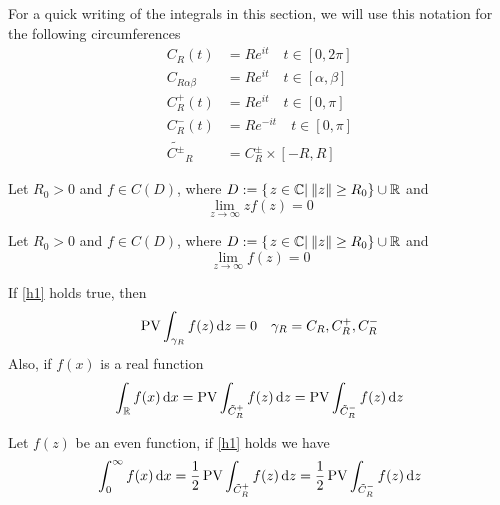 \documentclass[../complete.tex]{subfiles}
\begin{document}
\begin{ntn}
	For a quick writing of the integrals in this section, we will use this notation for the following circumferences
	\begin{equation*}
		\begin{aligned}
			C_R(t)&=Re^{it}\quad t\in[0,2\pi]\\
			C_{R\alpha\beta}&=Re^{it}\quad t\in[\alpha,\beta]\\
			C_R^+(t)&=Re^{it}\quad t\in[0,\pi]\\
			C_R^-(t)&=Re^{-it}\quad t\in[0,\pi]\\
			\tilde{C^{\pm}}_R&=C_R^{\pm}\times[-R,R]
		\end{aligned}
	\end{equation*}
\end{ntn}
\begin{hyp}
	Let $R_0>0$ and $f\in C(D)$, where $D:=\left\{ \left.z\in\mathbb{C}\right|_{}\norm{z}\ge R_0 \right\}\cup\mathbb{R}$ and
	\begin{equation*}
		\lim_{z\to\infty}zf(z)=0
	\end{equation*}
	\label{h1}
\end{hyp}
\begin{hyp}
	Let $R_0>0$ and $f\in C(D)$, where $D:=\left\{ \left.z\in\mathbb{C}\right|_{}\norm{z}\ge R_0 \right\}\cup\mathbb{R}$ and
	\begin{equation*}
		\lim_{z\to\infty}f(z)=0
	\end{equation*}
	\label{h2}
\end{hyp}
\begin{thm}
	If \eqref{h1} holds true, then
	\begin{equation}
		\operatorname{\mathrm{PV}}\int_{\gamma_R}^{}f(z)\operatorname{d\!} z=0\quad\gamma_R= C_R,C_R^+,C_R^-
		\label{eq:h11}
	\end{equation}
	Also, if $f(x)$ is a real function
	\begin{equation}
		\int_{\mathbb{R}}^{}f(x)\operatorname{d\!} x=\operatorname{\mathrm{PV}}\int_{\tilde{C}_R^+}f(z)\operatorname{d\!} z=\operatorname{\mathrm{PV}}\int_{\tilde{C}_R^-}^{}f(z)\operatorname{d\!} z
		\label{eq:h12}
	\end{equation}
\end{thm}
\begin{thm}
	Let $f(z)$ be an even function, if \eqref{h1} holds we have
	\begin{equation}
		\int_{0}^{\infty}f(x)\operatorname{d\!} x=\frac{1}{2}\operatorname{\mathrm{PV}}\int_{\tilde{C}^+_R}^{}f(z)\operatorname{d\!} z=\frac{1}{2}\operatorname{\mathrm{PV}}\int_{\tilde{C}^-_R}^{}f(z)\operatorname{d\!} z
		\label{eq:creven}
	\end{equation}
\end{thm}
\end{document}
